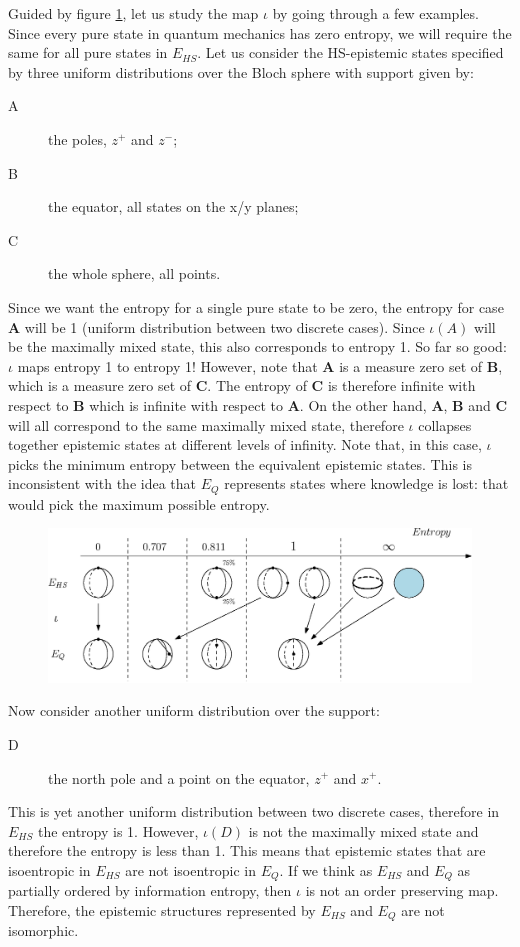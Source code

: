 \documentclass[twocolumn,prl,floatfix,superscriptaddress]{revtex4-2}
\begin{document}
Guided by figure \ref{fig_map}, let us study the map $\iota$ by going through a few examples. Since every pure state in quantum mechanics has zero entropy, we will require the same for all pure states in $E_{HS}$. Let us consider the HS-epistemic states specified by three uniform distributions over the Bloch sphere with support given by:
\begin{description}
	\item[A] the poles, $z^+$ and $z^-$;
	\item[B] the equator, all states on the x/y planes;
	\item[C] the whole sphere, all points.
\end{description}
Since we want the entropy for a single pure state to be zero, the entropy for case \textbf{A} will be 1 (uniform distribution between two discrete cases). Since $\iota(A)$ will be the maximally mixed state, this also corresponds to entropy 1. So far so good: $\iota$ maps entropy 1 to entropy 1! However, note that \textbf{A} is a measure zero set of \textbf{B}, which is a measure zero set of \textbf{C}. The entropy of \textbf{C} is therefore infinite with respect to \textbf{B} which is infinite with respect to \textbf{A}. On the other hand, \textbf{A}, \textbf{B} and \textbf{C} will all correspond to the same maximally mixed state, therefore $\iota$ collapses together epistemic states at different levels of infinity. Note that, in this case, $\iota$ picks the minimum entropy between the equivalent epistemic states. This is inconsistent with the idea that $E_{Q}$ represents states where knowledge is lost: that would pick the maximum possible entropy.

\begin{figure}
\includegraphics[scale=.4]{fig2}
\caption{\footnotesize{}}\label{fig_map}
\end{figure}

Now consider another uniform distribution over the support:
\begin{description}
	\item[D] the north pole and a point on the equator, $z^+$ and $x^+$.
\end{description}
This is yet another uniform distribution between two discrete cases, therefore in $E_{HS}$ the entropy is 1. However, $\iota(D)$ is not the maximally mixed state and therefore the entropy is less than 1. This means that epistemic states that are isoentropic in $E_{HS}$ are not isoentropic in $E_{Q}$. If we think as $E_{HS}$ and $E_{Q}$ as partially ordered by information entropy, then $\iota$ is not an order preserving map. Therefore, the epistemic structures represented by $E_{HS}$ and $E_{Q}$ are not isomorphic.
\end{document}
